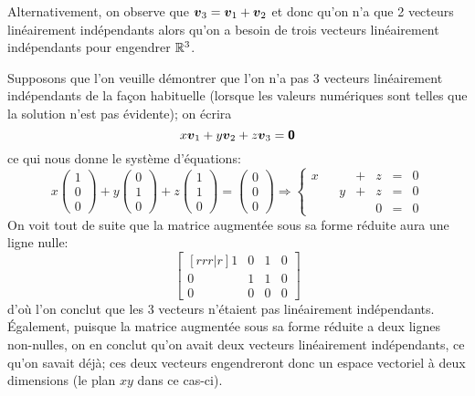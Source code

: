 Alternativement, on observe que $\boldsymbol{v}_3 = \boldsymbol{v}_1 + \boldsymbol{v}_2$ et donc qu'on n'a
que 2 vecteurs linéairement indépendants alors qu'on a besoin de trois vecteurs
linéairement indépendants pour engendrer  $\mathbb{R}^3$.

Supposons que l'on veuille démontrer que l'on
n'a pas 3 vecteurs linéairement indépendants de la façon habituelle (lorsque les
valeurs numériques sont telles que la solution n'est pas évidente); on écrira
\[
x \boldsymbol{v}_1 + y\boldsymbol{v}_2 + z\boldsymbol{v}_3 = \mbox{\textsf{\textbf{{0}}}}
\]
ce qui nous donne le système d'équations:
\[
x\begin{pmatrix}
1 \\ 0 \\ 0
\end{pmatrix} + y \begin{pmatrix}
0 \\ 1 \\ 0
\end{pmatrix} + z \begin{pmatrix}
1 \\ 1 \\ 0
\end{pmatrix} = \begin{pmatrix}
0 \\ 0 \\ 0
\end{pmatrix}\Rightarrow
 \left\{
\begin{matrix}
x &&  &+& z &=& 0 \\
 && y &+& z &=& 0 \\
 &&  && 0 &=& 0
\end{matrix}\right.
\]
On voit tout de suite que la matrice augmentée sous sa forme réduite aura une ligne nulle:
\[
\begin{bmatrix}[rrr|r]
1 & 0 & 1 & 0 \\
0 & 1 & 1 & 0 \\
0 & 0 & 0 & 0
\end{bmatrix}
\]
d'où l'on conclut que les 3 vecteurs n'étaient pas linéairement indépendants.
Également, puisque la matrice augmentée sous sa forme réduite a deux lignes
non-nulles, on en conclut qu'on avait deux vecteurs linéairement indépendants, 
ce qu'on savait déjà; ces deux vecteurs engendreront donc un espace vectoriel
à deux dimensions (le plan $xy$ dans ce cas-ci).

